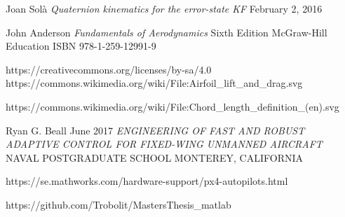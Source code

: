 \documentclass{article}
\begin{document}
\begin{thebibliography}{9}
Joan Sol\`{a}
\textit{Quaternion kinematics for the error-state KF}
February 2, 2016

John Anderson
\textit{Fundamentals of Aerodynamics}
Sixth Edition
McGraw-Hill Education
ISBN 978-1-259-12991-9

https://creativecommons.org/licenses/by-sa/4.0
https://commons.wikimedia.org/wiki/File:Airfoil\_lift\_and\_drag.svg

https://commons.wikimedia.org/wiki/File:Chord\_length\_definition\_(en).svg

Ryan G. Beall
June 2017
\textit{ENGINEERING OF FAST AND ROBUST ADAPTIVE
CONTROL FOR FIXED-WING UNMANNED AIRCRAFT}
NAVAL POSTGRADUATE SCHOOL MONTEREY, CALIFORNIA

https://se.mathworks.com/hardware-support/px4-autopilots.html

https://github.com/Trobolit/MastersThesis\_matlab


\end{thebibliography}
\end{document}

